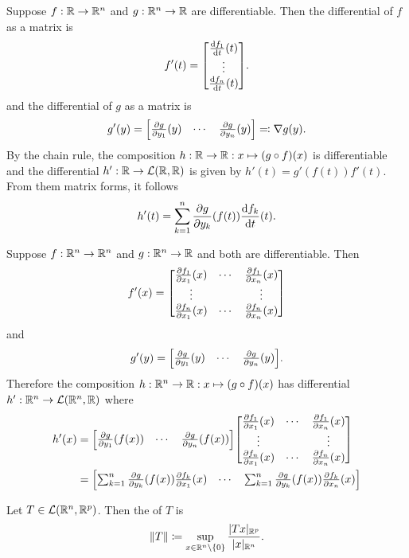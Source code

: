 \documentclass[../main.tex]{subfiles}
\begin{document}
\begin{example}
    Suppose $f : \mathbb{R} \to \mathbb{R}^n$ and $g : \mathbb{R}^n \to \mathbb{R}$ are differentiable. Then the differential of $f$ as a matrix is
    \[
        f'(t) = \mqty[\dv{f_1}{t}\relax(t) \\ \vdots \\ \dv{f_n}{t}\relax(t)]
    .\]
    and the differential of $g$ as a matrix is
    \[
        g'(y) = \mqty[\pdv{g}{y_1}\relax(y) & \cdots & \pdv{g}{y_n}\relax(y)] \eqcolon \nabla g(y)
    .\]
    By the chain rule, the composition $h : \mathbb{R} \to \mathbb{R} : x \mapsto (g \circ f)(x)$ is differentiable and the differential $h' : \mathbb{R} \to \mathcal{L}(\mathbb{R}, \mathbb{R})$ is given by $h'(t) = g'(f(t)) f'(t)$. From them matrix forms, it follows
    \[
        h'(t) = \sum_{k=1}^n \pdv{g}{y_k}\relax(f(t)) \dv{f_k}{t}\relax(t)
    .\]
\end{example}

\begin{example}
    Suppose $f : \mathbb{R}^n \to \mathbb{R}^n$ and $g : \mathbb{R}^n \to \mathbb{R}$ and both are differentiable. Then
    \[
        f'(x) = \mqty[
        \pdv{f_1}{x_1}\relax(x) & \cdots & \pdv{f_1}{x_n}\relax(x) \\
        \vdots                  &        & \vdots                  \\
        \pdv{f_n}{x_1}\relax(x) & \cdots & \pdv{f_n}{x_n}\relax(x) \\
        ]
    \]
    and
    \[
        g'(y) = \mqty[\pdv{g}{y_1}\relax(y) & \cdots & \pdv{g}{y_n}\relax(y)]
    .\]
Therefore the composition $h : \mathbb{R}^n \to \mathbb{R} : x \mapsto (g \circ f)(x)$ has differential $h' : \mathbb{R}^n \to \mathcal{L}(\mathbb{R}^n, \mathbb{R})$ where
    \begin{align*}
        h'(x) &= \mqty[\pdv{g}{y_1}\relax(f(x)) & \cdots & \pdv{g}{y_n}\relax(f(x))] \mqty[
        \pdv{f_1}{x_1}\relax(x) & \cdots & \pdv{f_1}{x_n}\relax(x) \\
        \vdots                  &        & \vdots                  \\
        \pdv{f_n}{x_1}\relax(x) & \cdots & \pdv{f_n}{x_n}\relax(x) \\
        ] \\
                                &= \mqty[
        \sum_{k=1}^n \pdv{g}{y_k}\relax(f(x)) \pdv{f_k}{x_1}\relax(x) & \cdots & \sum_{k=1}^n \pdv{g}{y_k}\relax(f(x)) \pdv{f_k}{x_n}\relax(x)
                                ]
    \end{align*}
\end{example}

\begin{definition}
    Let $T \in \mathcal{L}(\mathbb{R}^n, \mathbb{R}^p)$. Then the  of $T$ is
    \[
        \norm{T} \coloneq \sup_{x \in \mathbb{R}^n \setminus \qty{0}} \frac{|Tx|_{\mathbb{R}^p}}{|x|_{\mathbb{R}^n}}
    .\]
\end{definition}
\end{document}
